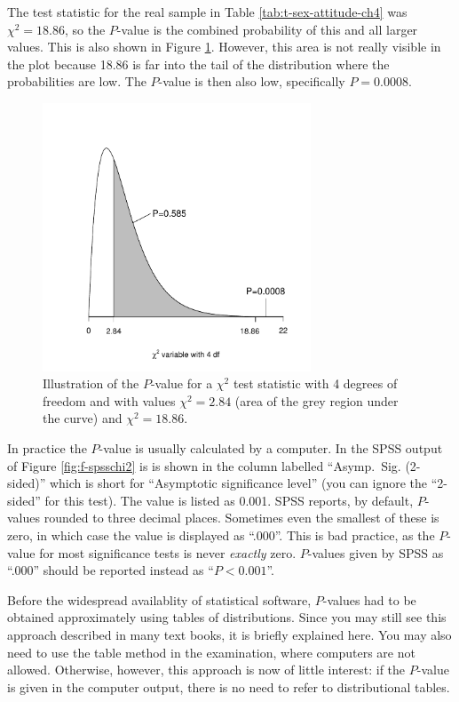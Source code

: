 \documentclass[11pt,a4paper,openany]{book}
\begin{document}
The test statistic for the real sample in Table
\ref{tab:t-sex-attitude-ch4} was \(\chi^{2}=18.86\), so the \(P\)-value
is the combined probability of this and all larger values. This is also
shown in Figure \ref{fig:f-pvalchisq}. However, this area is not really
visible in the plot because 18.86 is far into the tail of the
distribution where the probabilities are low. The \(P\)-value is then
also low, specifically \(P=0.0008\).

\begin{figure}[htbp]
\centering
\includegraphics[width=8.00000cm]{chi2_pval.pdf}
\caption{\label{fig:f-pvalchisq} Illustration of the \(P\)-value for a
\(\chi^{2}\) test statistic with 4 degrees of freedom and with values
\(\chi^{2}=2.84\) (area of the grey region under the curve) and
\(\chi^{2}=18.86\).}
\end{figure}

In practice the \(P\)-value is usually calculated by a computer. In the
SPSS output of Figure \ref{fig:f-spsschi2} is is shown in the column
labelled ``Asymp.~Sig. (2-sided)'' which is short for ``Asymptotic
significance level'' (you can ignore the ``2-sided'' for this test). The
value is listed as 0.001. SPSS reports, by default, \(P\)-values rounded
to three decimal places. Sometimes even the smallest of these is zero,
in which case the value is displayed as ``.000''. This is bad practice,
as the \(P\)-value for most significance tests is never \emph{exactly}
zero. \(P\)-values given by SPSS as ``.000'' should be reported instead
as ``\(P<0.001\)''.

Before the widespread availablity of statistical software, \(P\)-values
had to be obtained approximately using tables of distributions. Since
you may still see this approach described in many text books, it is
briefly explained here. You may also need to use the table method in the
examination, where computers are not allowed. Otherwise, however, this
approach is now of little interest: if the \(P\)-value is given in the
computer output, there is no need to refer to distributional tables.
\end{document}
